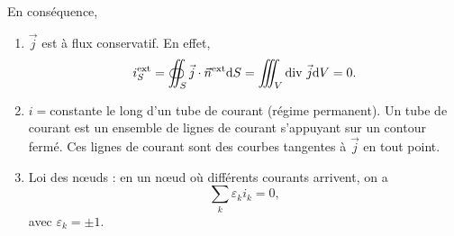        En conséquence, 
        \begin{enumerate}[label=(\roman*)]
            \item $\vec{j}$ est à flux conservatif. En effet,
            \begin{equation*}
                i_S^{\text{ext}}=\oiint_{S}\vec{j}\cdot\vec{n}^{\text{ext}}\mathrm{d} S=\iiint_{V}\mathrm{div}~\vec{j}\mathrm{d} V=0.
            \end{equation*}
            \item $i=$constante le long d'un tube de courant (régime permanent). Un tube de courant est un ensemble de lignes de courant s'appuyant sur un contour fermé. Ces lignes de courant sont des courbes tangentes à $\vec{j}$ en tout point.
            \item Loi des n\oe uds : en un n\oe ud où différents courants arrivent, on a 
            \begin{equation*}
                \boxed{
                    \sum_{k}\varepsilon_{k}i_k=0,
                }
            \end{equation*}
            avec $\varepsilon_{k}=\pm1$.
        \end{enumerate}